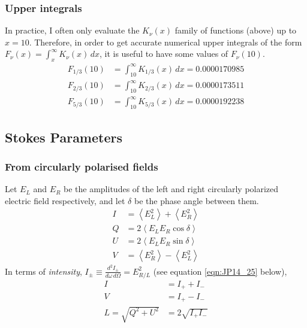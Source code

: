 \documentclass{article}
\begin{document}
\subsubsection{Upper integrals}

In practice, I often only evaluate the $K_\nu(x)$ family of functions (above) up to $x = 10$.
Therefore, in order to get accurate numerical upper integrals of the form $F_\nu(x) = \int_x^\infty K_\nu(x)\,dx$, it is useful to have some values of $F_\nu(10)$.
\begin{align}
    F_{1/3}(10) &= \int_{10}^\infty K_{1/3}(x)\,dx = 0.0000170985 \\
    F_{2/3}(10) &= \int_{10}^\infty K_{2/3}(x)\,dx = 0.0000173511 \\
    F_{5/3}(10) &= \int_{10}^\infty K_{5/3}(x)\,dx = 0.0000192238
\end{align}

\subsection{Stokes Parameters}

\subsubsection{From circularly polarised fields}

Let $E_L$ and $E_R$ be the amplitudes of the left and right circularly polarized electric field respectively, and let $\delta$ be the phase angle between them.
\begin{equation}
    \begin{aligned}
        I &= \left\langle E_L^2 \right\rangle + \left\langle E_R^2 \right\rangle \\
        Q &= 2\left\langle E_L E_R \cos\delta \right\rangle \\
        U &= 2\left\langle E_L E_R \sin\delta \right\rangle \\
        V &= \left\langle E_R^2 \right\rangle - \left\langle E_L^2 \right\rangle
    \end{aligned}
\end{equation}
In terms of \emph{intensity}, $I_\pm \equiv \frac{d^2I_\pm}{d\omega\,d\Omega} = E_{R/L}^2$ (see equation \ref{eqn:JP14_25} below),
\begin{equation}
    \begin{aligned}
        I &= I_+ + I_- \\
        V &= I_+ - I_- \\
        L = \sqrt{Q^2 + U^2} &= 2\sqrt{I_+ I_-}
    \end{aligned}
\end{equation}
\end{document}
